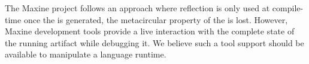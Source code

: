 The Maxine project follows an approach where reflection is only used at compile-time \ie once the \VM is generated, the metacircular property of the \VM is lost. However, Maxine development tools provide a live interaction with the complete state of the running \VM artifact while debugging it. We believe such a tool support should be available to manipulate a language runtime.

%
%

